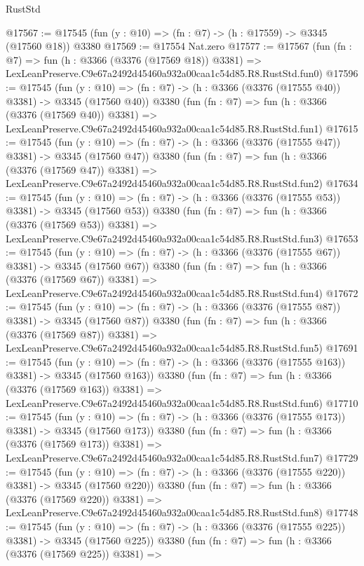 \begin{lexlean}{RustStd}
\begin{coremodule}
@17567 := @17545 (fun (y : @10) => (fn : @7) -> (h : @17559) -> @3345 (@17560 @18)) @3380
@17569 := @17554 Nat.zero
@17577 := @17567
    (fun (fn : @7) =>
    fun (h : @3366 (@3376 (@17569 @18)) @3381) =>
    LexLeanPreserve.C9e67a2492d45460a932a00caa1c54d85.R8.RustStd.fun0)
@17596 := @17545
    (fun (y : @10) => (fn : @7) -> (h : @3366 (@3376 (@17555 @40)) @3381) -> @3345 (@17560 @40))
    @3380
    (fun (fn : @7) =>
    fun (h : @3366 (@3376 (@17569 @40)) @3381) =>
    LexLeanPreserve.C9e67a2492d45460a932a00caa1c54d85.R8.RustStd.fun1)
@17615 := @17545
    (fun (y : @10) => (fn : @7) -> (h : @3366 (@3376 (@17555 @47)) @3381) -> @3345 (@17560 @47))
    @3380
    (fun (fn : @7) =>
    fun (h : @3366 (@3376 (@17569 @47)) @3381) =>
    LexLeanPreserve.C9e67a2492d45460a932a00caa1c54d85.R8.RustStd.fun2)
@17634 := @17545
    (fun (y : @10) => (fn : @7) -> (h : @3366 (@3376 (@17555 @53)) @3381) -> @3345 (@17560 @53))
    @3380
    (fun (fn : @7) =>
    fun (h : @3366 (@3376 (@17569 @53)) @3381) =>
    LexLeanPreserve.C9e67a2492d45460a932a00caa1c54d85.R8.RustStd.fun3)
@17653 := @17545
    (fun (y : @10) => (fn : @7) -> (h : @3366 (@3376 (@17555 @67)) @3381) -> @3345 (@17560 @67))
    @3380
    (fun (fn : @7) =>
    fun (h : @3366 (@3376 (@17569 @67)) @3381) =>
    LexLeanPreserve.C9e67a2492d45460a932a00caa1c54d85.R8.RustStd.fun4)
@17672 := @17545
    (fun (y : @10) => (fn : @7) -> (h : @3366 (@3376 (@17555 @87)) @3381) -> @3345 (@17560 @87))
    @3380
    (fun (fn : @7) =>
    fun (h : @3366 (@3376 (@17569 @87)) @3381) =>
    LexLeanPreserve.C9e67a2492d45460a932a00caa1c54d85.R8.RustStd.fun5)
@17691 := @17545
    (fun (y : @10) => (fn : @7) -> (h : @3366 (@3376 (@17555 @163)) @3381) -> @3345 (@17560 @163))
    @3380
    (fun (fn : @7) =>
    fun (h : @3366 (@3376 (@17569 @163)) @3381) =>
    LexLeanPreserve.C9e67a2492d45460a932a00caa1c54d85.R8.RustStd.fun6)
@17710 := @17545
    (fun (y : @10) => (fn : @7) -> (h : @3366 (@3376 (@17555 @173)) @3381) -> @3345 (@17560 @173))
    @3380
    (fun (fn : @7) =>
    fun (h : @3366 (@3376 (@17569 @173)) @3381) =>
    LexLeanPreserve.C9e67a2492d45460a932a00caa1c54d85.R8.RustStd.fun7)
@17729 := @17545
    (fun (y : @10) => (fn : @7) -> (h : @3366 (@3376 (@17555 @220)) @3381) -> @3345 (@17560 @220))
    @3380
    (fun (fn : @7) =>
    fun (h : @3366 (@3376 (@17569 @220)) @3381) =>
    LexLeanPreserve.C9e67a2492d45460a932a00caa1c54d85.R8.RustStd.fun8)
@17748 := @17545
    (fun (y : @10) => (fn : @7) -> (h : @3366 (@3376 (@17555 @225)) @3381) -> @3345 (@17560 @225))
    @3380
    (fun (fn : @7) =>
    fun (h : @3366 (@3376 (@17569 @225)) @3381) =>

\end{coremodule}
\end{lexlean}
